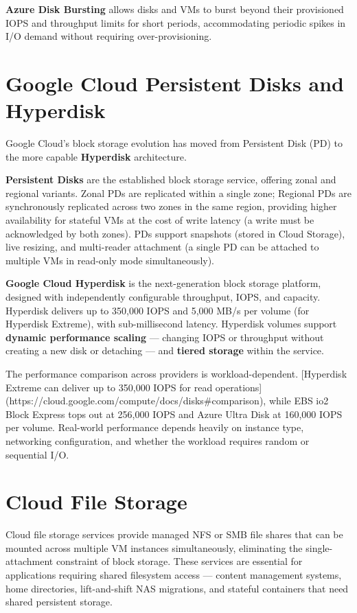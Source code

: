 \textbf{Azure Disk Bursting} allows disks and VMs to burst beyond their provisioned IOPS and throughput limits for short periods, accommodating periodic spikes in I/O demand without requiring over-provisioning.

\section{Google Cloud Persistent Disks and Hyperdisk}
Google Cloud's block storage evolution has moved from Persistent Disk (PD) to the more capable \textbf{Hyperdisk} architecture.

\textbf{Persistent Disks} are the established block storage service, offering zonal and regional variants. Zonal PDs are replicated within a single zone; Regional PDs are synchronously replicated across two zones in the same region, providing higher availability for stateful VMs at the cost of write latency (a write must be acknowledged by both zones). PDs support snapshots (stored in Cloud Storage), live resizing, and multi-reader attachment (a single PD can be attached to multiple VMs in read-only mode simultaneously).

\textbf{Google Cloud Hyperdisk} is the next-generation block storage platform, designed with independently configurable throughput, IOPS, and capacity. Hyperdisk delivers up to 350,000 IOPS and 5,000 MB/s per volume (for Hyperdisk Extreme), with sub-millisecond latency. Hyperdisk volumes support \textbf{dynamic performance scaling} --- changing IOPS or throughput without creating a new disk or detaching --- and \textbf{tiered storage} within the service.

The performance comparison across providers is workload-dependent. {[}Hyperdisk Extreme can deliver up to 350,000 IOPS for read operations{]}(https://cloud.google.com/compute/docs/disks\#comparison), while EBS io2 Block Express tops out at 256,000 IOPS and Azure Ultra Disk at 160,000 IOPS per volume. Real-world performance depends heavily on instance type, networking configuration, and whether the workload requires random or sequential I/O.

\section{Cloud File Storage}
Cloud file storage services provide managed NFS or SMB file shares that can be mounted across multiple VM instances simultaneously, eliminating the single-attachment constraint of block storage. These services are essential for applications requiring shared filesystem access --- content management systems, home directories, lift-and-shift NAS migrations, and stateful containers that need shared persistent storage.


